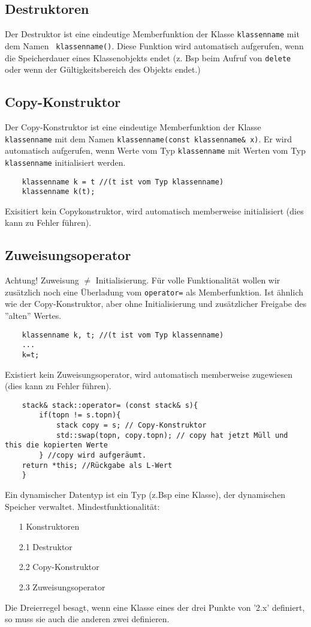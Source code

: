 \subsection{Destruktoren}
Der Destruktor ist eine eindeutige Memberfunktion der Klasse \texttt{klassenname} mit dem Namen \texttt{~klassenname()}. Diese Funktion wird automatisch aufgerufen, wenn die Speicherdauer eines Klassenobjekts endet (z. Bsp beim Aufruf von \texttt{delete} oder wenn der Gültigkeitsbereich des Objekts endet.)
\subsection{Copy-Konstruktor}
Der Copy-Konstruktor ist eine eindeutige Memberfunktion der Klasse \texttt{klassenname} mit dem Namen \texttt{klassenname(const klassenname\& x)}. Er wird automatisch aufgerufen, wenn Werte vom Typ \texttt{klassenname} mit Werten vom Typ \texttt{klassenname} initialisiert werden.
\begin{lstlisting}
	klassenname k = t //(t ist vom Typ klassenname)
	klassenname k(t);
\end{lstlisting}
Exisitiert kein Copykonstruktor, wird automatisch memberweise initialisiert (dies kann zu Fehler führen).
\subsection{Zuweisungsoperator}
Achtung! Zuweisung $\neq$ Initialisierung. Für volle Funktionalität wollen wir zusätzlich noch eine Überladung vom \texttt{operator=} als Memberfunktion. Ist ähnlich wie der Copy-Konstruktor, aber ohne Initialisierung und zusätzlicher Freigabe des ''alten'' Wertes.
\begin{lstlisting}
	klassenname k, t; //(t ist vom Typ klassenname)
	...
	k=t;
\end{lstlisting}
Existiert kein Zuweisungsoperator, wird automatisch memberweise zugewiesen (dies kann zu Fehler führen).
\begin{lstlisting}
	stack& stack::operator= (const stack& s){
		if(topn != s.topn){
			stack copy = s; // Copy-Konstruktor
			std::swap(topn, copy.topn); // copy hat jetzt Müll und this die kopierten Werte
		} //copy wird aufgeräumt.
	return *this; //Rückgabe als L-Wert
	}
\end{lstlisting}
Ein dynamischer Datentyp ist ein Typ (z.Bsp eine Klasse), der dynamischen Speicher verwaltet. Mindestfunktionalität:
\begin{itemize}
	\item[1] Konstruktoren
	\item[2.1] Destruktor
	\item[2.2] Copy-Konstruktor
	\item[2.3] Zuweisungsoperator
\end{itemize}
Die Dreierregel besagt, wenn eine Klasse eines der drei Punkte von '2.x' definiert, so muss sie auch die anderen zwei definieren.





